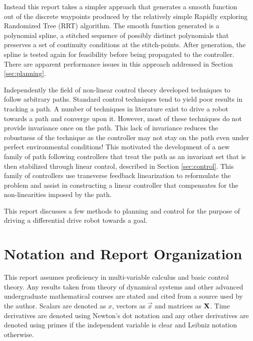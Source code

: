 \documentclass[oneside, 11pt]{book}
\begin{document}
Instead this report takes a simpler approach that generates a smooth function out of the discrete waypoints produced by the relatively simple Rapidly exploring Randomized Tree (RRT) algorithm. The smooth function generated is a polynomial spline, a stitched sequence of possibly distinct polynomials that preserves a set of continuity conditions at the stitch-points. After generation, the spline is tested again for feasibility before being propagated to the controller. There are apparent performance issues in this approach addressed in Section \ref{sec:planning}.

Independently the field of non-linear control theory developed techniques to follow arbitrary paths. Standard control techniques tend to yield poor results in tracking a path. A number of techniques in literature exist to drive a robot towards a path and converge upon it. However, most of these techniques do not provide invariance once on the path\cite{Gill15}. This lack of invariance reduces the robustness of the technique as the controller may not stay on the path even under perfect environmental conditions! This motivated the development of a new family of path following controllers that treat the path as an invariant set that is then stabilized through linear control, described in Section \ref{sec:control}. This family of controllers use transverse feedback linearization to reformulate the problem and assist in constructing a linear controller that compensates for the non-linearities imposed by the path.

This report discusses a few methods to planning and control for the purpose of driving a differential drive robot towards a goal.

\section{Notation and Report Organization}
This report assumes proficiency in multi-variable calculus and basic control theory. Any results taken from theory of dynamical systems and other advanced undergraduate mathematical courses are stated and cited from a source used by the author. Scalars are denoted as $x$, vectors as $\vec{x}$ and matrices as $\mathbf{X}$. Time derivatives are denoted using Newton's dot notation and any other derivatives are denoted using primes if the independent variable is clear and Leibniz notation otherwise.
\end{document}
